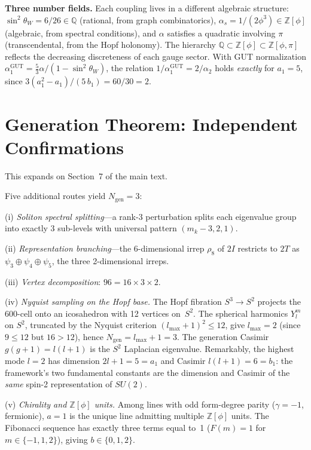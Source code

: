 \documentclass[12pt,a4paper]{article}
\theoremstyle{definition}
\begin{document}
\textbf{Three number fields.} Each coupling lives in a different algebraic structure: $\sin^2\theta_W = 6/26 \in \mathbb{Q}$ (rational, from graph combinatorics), $\alpha_s = 1/(2\phi^3) \in \mathbb{Z}[\phi]$ (algebraic, from spectral conditions), and $\alpha$ satisfies a quadratic involving $\pi$ (transcendental, from the Hopf holonomy). The hierarchy $\mathbb{Q} \subset \mathbb{Z}[\phi] \subset \mathbb{Z}[\phi, \pi]$ reflects the decreasing discreteness of each gauge sector. With GUT normalization $\alpha_1^{\text{GUT}} = \tfrac{5}{3}\alpha/(1 - \sin^2\theta_W)$, the relation $1/\alpha_1^{\text{GUT}} = 2/\alpha_2$ holds \emph{exactly} for $a_1 = 5$, since $3(a_1^2 - a_1)/(5\,b_1) = 60/30 = 2$.


\section{Generation Theorem: Independent Confirmations}
\label{sec:S-generations}

This expands on Section~7 of the main text.

Five additional routes yield $N_{\text{gen}} = 3$:

(i) \textit{Soliton spectral splitting}---a rank-3 perturbation splits each eigenvalue group into exactly 3 sub-levels with universal pattern $(m_k - 3, 2, 1)$.

(ii) \textit{Representation branching}---the 6-dimensional irrep $\rho_8$ of $2I$ restricts to $2T$ as $\psi_3 \oplus \psi_4 \oplus \psi_5$, the three 2-dimensional irreps.

(iii) \textit{Vertex decomposition}: $96 = 16 \times 3 \times 2$.

(iv) \textit{Nyquist sampling on the Hopf base.} The Hopf fibration $S^3 \to S^2$ projects the 600-cell onto an icosahedron with 12 vertices on~$S^2$. The spherical harmonics $Y_l^m$ on $S^2$, truncated by the Nyquist criterion $(l_{\max}+1)^2 \leq 12$, give $l_{\max} = 2$ (since $9 \leq 12$ but $16 > 12$), hence $N_{\text{gen}} = l_{\max} + 1 = 3$. The generation Casimir $g(g+1) = l(l+1)$ is the $S^2$ Laplacian eigenvalue. Remarkably, the highest mode $l = 2$ has dimension $2l+1 = 5 = a_1$ and Casimir $l(l+1) = 6 = b_1$: the framework's two fundamental constants are the dimension and Casimir of the \emph{same} spin-2 representation of $SU(2)$.

(v) \textit{Chirality and $\mathbb{Z}[\phi]$ units.}  Among lines with odd form-degree parity ($\gamma = -1$, fermionic), $a = 1$ is the unique line admitting multiple $\mathbb{Z}[\phi]$ units.  The Fibonacci sequence has exactly three terms equal to~1 ($F(m) = 1$ for $m \in \{-1, 1, 2\}$), giving $b \in \{0, 1, 2\}$.
\end{document}
